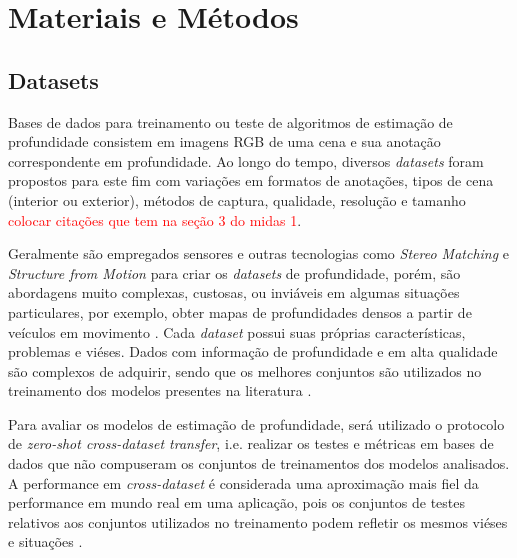 
\chapter{Materiais e Métodos}

\section{Datasets}

Bases de dados para treinamento ou teste de algoritmos de estimação de profundidade consistem em imagens RGB de uma cena e sua anotação correspondente em profundidade. Ao longo do tempo, diversos \textit{datasets} foram propostos para este fim com variações em formatos de anotações, tipos de cena (interior ou exterior), métodos de captura, qualidade, resolução e tamanho \textcolor{red}{colocar citações que tem na seção 3 do midas 1}.

Geralmente são empregados sensores e outras tecnologias como \textit{Stereo Matching} e \textit{Structure from Motion} para criar os \textit{datasets} de profundidade, porém, são abordagens muito complexas, custosas, ou inviáveis em algumas situações particulares, por exemplo, obter mapas de profundidades densos a partir de veículos em movimento  \cite{yang2024depthv1}.
Cada \textit{dataset} possui suas próprias características, problemas e viéses. Dados com informação de profundidade e em alta qualidade são complexos de adquirir, sendo que os melhores conjuntos são utilizados no treinamento dos modelos presentes na literatura \cite{ranftl2020towards}. 

Para avaliar os modelos de estimação de profundidade, será utilizado o protocolo de \textit{zero-shot cross-dataset transfer}, i.e. realizar os testes e métricas em bases de dados que não compuseram os conjuntos de treinamentos dos modelos analisados. A performance em \textit{cross-dataset} é considerada uma aproximação mais fiel da performance em mundo real em uma aplicação, pois os conjuntos de testes relativos aos conjuntos utilizados no treinamento podem refletir os mesmos viéses e situações \cite{ranftl2020towards}.



